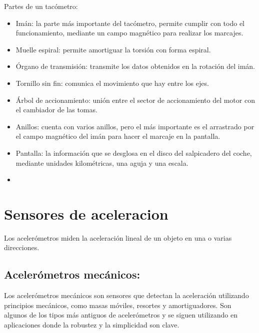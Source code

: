 Partes de un tacómetro: 
\begin{itemize}
    \item Imán: la parte más importante del tacómetro, permite cumplir con todo el funcionamiento, mediante un campo magnético para realizar los marcajes.
    \item Muelle espiral: permite amortiguar la torsión con forma espiral.
    \item Órgano de transmisión: transmite los datos obtenidos en la rotación del imán.
    \item Tornillo sin fin: comunica el movimiento que hay entre los ejes.
    \item Árbol de accionamiento: unión entre el sector de accionamiento del motor con el cambiador de las tomas.
    \item Anillos: cuenta con varios anillos, pero el más importante es el arrastrado por el campo magnético del imán para hacer el marcaje en la pantalla.
    \item Pantalla: la información que se desglosa en el disco del salpicadero del coche, mediante unidades kilométricas, una aguja y una escala.
    \item 
\end{itemize}

\section{Sensores de aceleracion}
Los acelerómetros miden la aceleración lineal de un objeto en una o varias direcciones.

\subsection{Acelerómetros mecánicos: }
Los acelerómetros mecánicos son sensores que detectan la aceleración utilizando principios mecánicos, como masas móviles, resortes y amortiguadores. Son algunos de los tipos más antiguos de acelerómetros y se siguen utilizando en aplicaciones donde la robustez y la simplicidad son clave.

